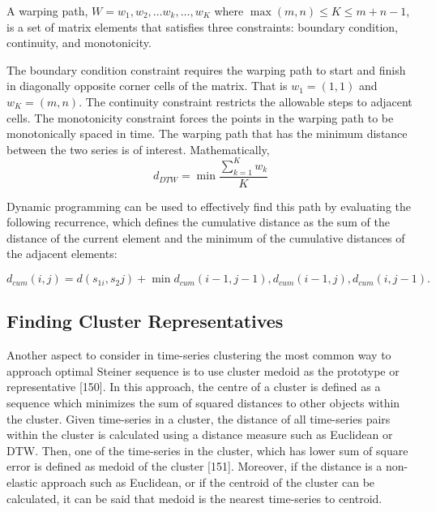 A warping path, $W = w_{1} , w_{2}, \ldots w_{k}, \ldots, w_{K}$ where $\max(m, n) \leq K \leq m + n-1$, is a set of matrix elements that satisfies three constraints: boundary condition, continuity, and monotonicity. 

The boundary condition constraint requires the warping path to start and finish in diagonally opposite corner cells of the matrix. That is $w_{1} = (1, 1)$ and $w_{K} = (m, n)$. The continuity constraint restricts the allowable steps to adjacent cells. The monotonicity constraint forces the points in the warping path to be monotonically spaced in time. The warping path that has the minimum distance between the two series is of interest. Mathematically, 
\begin{equation}
d_{DTW} = \min \frac{\sum_{k=1}^{K} w_{k}}{K}
\end{equation}

Dynamic programming can be used to effectively find this path by evaluating the following recurrence, which defines the cumulative distance as the sum of the distance of the current element and the minimum of the cumulative distances of the adjacent elements:

\begin{equation}
d_{cum}(i,j) = d(s_{1i}, s_2{j}) + \min{d_{cum} (i-1, j-1), d_{cum} (i-1, j ), d_{cum} (i, j-1)}.
\end{equation}

\subsection{Finding Cluster Representatives}

Another aspect to consider in time-series clustering the most common way to approach optimal Steiner sequence is to use cluster medoid as the prototype or representative [150]. In this approach, the centre of a cluster is defined as a sequence which minimizes the sum of squared distances to other objects within the cluster. Given time-series in a cluster, the distance of all time-series pairs within the cluster is calculated using a distance measure such as Euclidean or DTW. Then, one of the time-series in the cluster, which has lower sum of square error is defined as medoid of the cluster [151]. Moreover, if the distance is a non-elastic approach such as Euclidean, or if the centroid of the cluster can be calculated, it can be said that medoid is the nearest time-series to centroid.

